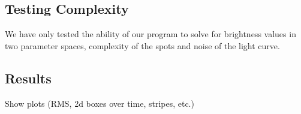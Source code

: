 \documentclass[iop]{emulateapj}
\begin{document}

\subsection{Testing Complexity}
We have only tested the ability of our program to solve for brightness values in two parameter spaces, complexity of the spots and noise of the light curve.

\subsection{Results}
Show plots (RMS, 2d boxes over time, stripes, etc.)
%
%
\end{document}
